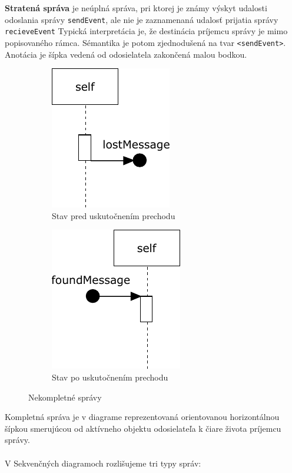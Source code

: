 \begin{defn}
	\textbf{Stratená správa} je neúplná správa, pri ktorej je známy výskyt udalosti odoslania správy \lstinline{sendEvent}, ale nie je zaznamenaná udalosť prijatia správy \lstinline{recieveEvent} 
	Typická interpretácia je, že destinácia príjemcu správy je mimo popisovaného rámca. Sémantika je potom zjednodušená na tvar 
	\lstinline{<sendEvent>}.
	Anotácia je šípka vedená od odosielatela zakončená malou bodkou.
\end{defn}

\begin{figure}[H]
	\centering
	\begin{subfigure}[t]{0.4\textwidth}
		\centering
		\includegraphics[scale=0.75]{obrazky-figures/SD-lost-ex}
		\caption{Stav pred uskutočnením prechodu}
	\end{subfigure}
	\begin{subfigure}[t]{0.4\textwidth}
		\centering
		\includegraphics[scale=0.75]{obrazky-figures/SD-found-ex}
		\caption{Stav po uskutočnením prechodu}
	\end{subfigure}
	\caption{Nekompletné správy}
	\label{fig:uncomplete-mes}
\end{figure}

Kompletná správa je v diagrame reprezentovaná orientovanou horizontálnou šípkou smerujúcou od aktívneho objektu odosielateľa k čiare života príjemcu správy. \\\\
V Sekvenčných diagramoch rozlišujeme tri typy správ:

